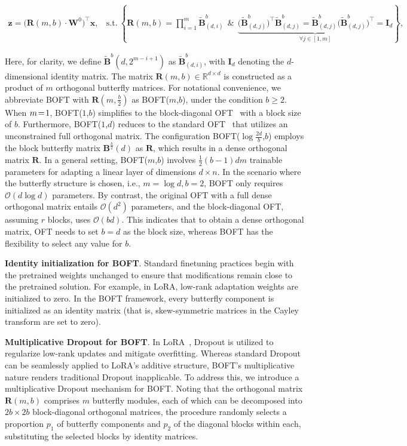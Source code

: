 \begin{equation}
    \begin{aligned}\nonumber
    \bm{z}=\big(\bm{R}(m,b)\cdot\bm{W}^0\big)^\top\bm{x},~~~~\text{s.t.}~\left\{\bm{R}(m,b)=\prod_{i=1}^m \tilde{\bm{B}}^b_{(d,i)}~~\&~~\underbrace{\big(\tilde{\bm{B}}^b_{(d,j)}\big)^\top\tilde{\bm{B}}^b_{(d,j)}=\tilde{\bm{B}}^b_{(d,j)}\big(\tilde{\bm{B}}^b_{(d,j)}\big)^\top\!=\bm{I}_d}_{\forall j\in [1, m]}\right\},
    \end{aligned}
\end{equation}

Here, for clarity, we define $\tilde{\bm{B}}^b(d,2^{m - i+1})$ as $\tilde{\bm{B}}^b_{(d,i)}$, with $\bm{I}_d$ denoting the $d$-dimensional identity matrix. The matrix $\bm{R}(m,b)\in\mathbb{R}^{d\times d}$ is constructed as a product of $m$ orthogonal butterfly matrices. For notational convenience, we abbreviate BOFT with $\bm{R}(m,\frac{b}{2})$ as BOFT($m$,$b$), under the condition $b\geq 2$. When $\thickmuskip=2mu \medmuskip=2mu m=1$, BOFT($1$,$b$) simplifies to the block-diagonal OFT~\cite{qiu2023controlling} with a block size of $b$. Furthermore, BOFT($1$,$d$) reduces to the standard OFT~\cite{qiu2023controlling} that utilizes an unconstrained full orthogonal matrix. The configuration BOFT($\log \frac{2d}{b}$,$b$) employs the block butterfly matrix $\bm{B}^{\frac{b}{2}}(d)$ as $\bm{R}$, which results in a dense orthogonal matrix $\bm{R}$. In a general setting, BOFT($m$,$b$) involves $\frac{1}{2}(b-1)dm$ trainable parameters for adapting a linear layer of dimensions $d\times n$. In the scenario where the butterfly structure is chosen, i.e., $m=\log d, b=2$, BOFT only requires $\mathcal{O}(d\log d)$ parameters. By contrast, the original OFT with a full dense orthogonal matrix entails $\mathcal{O}(d^2)$ parameters, and the block-diagonal OFT, assuming $r$ blocks, uses $\mathcal{O}(bd)$. This indicates that to obtain a dense orthogonal matrix, OFT needs to set $b=d$ as the block size, whereas BOFT has the flexibility to select any value for $b$.

\textbf{Identity initialization for BOFT}. Standard finetuning practices begin with the pretrained weights unchanged to ensure that modifications remain close to the pretrained solution. For example, in LoRA, low-rank adaptation weights are initialized to zero. In the BOFT framework, every butterfly component is initialized as an identity matrix (that is, skew-symmetric matrices in the Cayley transform are set to zero).

\textbf{Multiplicative Dropout for BOFT}. In LoRA~\cite{hulora2022}, Dropout is utilized to regularize low-rank updates and mitigate overfitting. Whereas standard Dropout~\cite{srivastava2014dropout} can be seamlessly applied to LoRA’s additive structure, BOFT's multiplicative nature renders traditional Dropout inapplicable. To address this, we introduce a multiplicative Dropout mechanism for BOFT. Noting that the orthogonal matrix $\bm{R}(m,b)$ comprises $m$ butterfly modules, each of which can be decomposed into $2b\times 2b$ block-diagonal orthogonal matrices, the procedure randomly selects a proportion $p_1$ of butterfly components and $p_2$ of the diagonal blocks within each, substituting the selected blocks by identity matrices.

